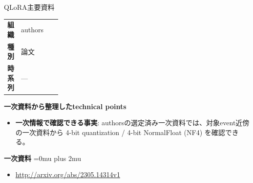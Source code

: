 \begin{technicalnote}{QLoRA}{主要資料}
\begingroup
\begin{tabularx}{\linewidth}{@{}>{\bfseries}p{0.22\linewidth}X@{}}
組織 & authors \\
種別 & 論文 \\
時系列 & — \\
\end{tabularx}
\smallskip
{\bfseries 一次資料から整理したtechnical points}
\begin{itemize}[leftmargin=1.5em,itemsep=0.35em]
\item \textbf{一次情報で確認できる事実}: authorsの選定済み一次資料では、対象event近傍の一次資料から 4-bit quantization / 4-bit NormalFloat (NF4) を確認できる。
\end{itemize}
\begin{minipage}{\linewidth}
\begin{samepage}
{\bfseries 一次資料}
\begingroup\sloppy
\Urlmuskip=0mu plus 2mu\relax
\begin{itemize}[leftmargin=1.5em,itemsep=0.25em]
\item {\scriptsize\url{http://arxiv.org/abs/2305.14314v1}}
\end{itemize}
\endgroup
\end{samepage}
\end{minipage}
\endgroup
\end{technicalnote}
\medskip

